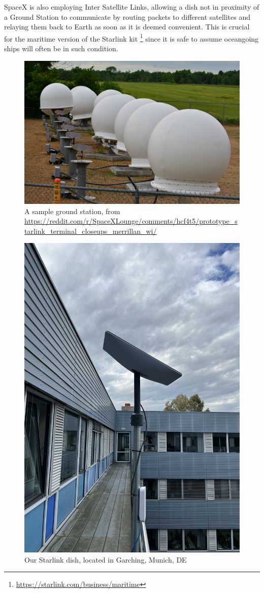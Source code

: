 \documentclass[IN,11pt,twoside,openright,idp,english]{tumthesis}
\begin{document}
SpaceX is also employing Inter Satellite Links, allowing a dish not in proximity of a Ground Station to communicate by routing packets to different satellites and relaying them back to Earth as soon as it is deemed convenient. This is crucial for the maritime version of the Starlink kit \footnote{\url{https://starlink.com/business/maritime}} since it is safe to assume oceangoing ships will often be in such condition.
   
\begin{figure}
    \centering
    \includegraphics[width=0.6\columnwidth]{img/ground-station.jpeg}
    \caption{A sample ground station, from \small\protect\url{https://reddit.com/r/SpaceXLounge/comments/hcf4t5/prototype_starlink_terminal_closeups_merrillan_wi/}}
    \label{fig:gs}
\end{figure}
    
\begin{figure}
    \centering
    \includegraphics[width=0.6\columnwidth]{img/dish.jpeg}
    \caption{Our Starlink dish, located in Garching, Munich, DE}
    \label{fig:dish}
\end{figure}
    
\end{document}
